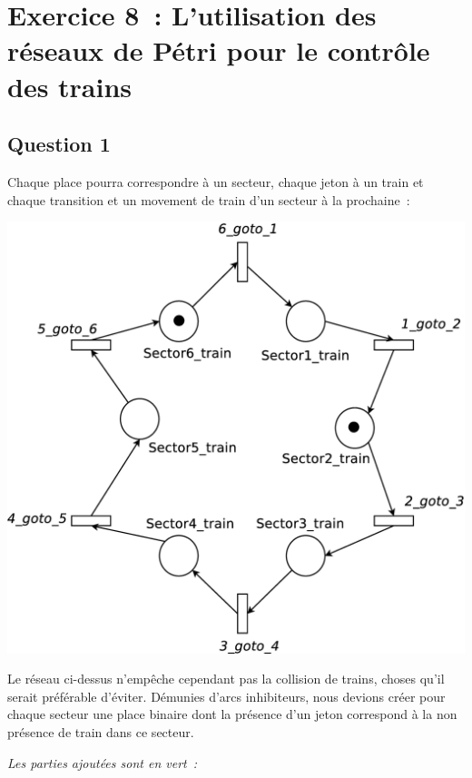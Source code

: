 \section*{Exercice 8~: L'utilisation des réseaux de Pétri pour le
  contrôle des trains}

\subsection*{Question 1}

Chaque place pourra correspondre à un secteur, chaque jeton à un train et chaque
transition et un movement de train d'un secteur à la prochaine~:

\begin{center}
\includegraphics[height = 0.3\paperwidth]{exo8_1.eps}
\end{center}

Le réseau ci-dessus n'empêche cependant pas la collision de trains, choses qu'il 
serait préférable d'éviter. Démunies d'arcs inhibiteurs, nous devions créer pour 
chaque secteur une place binaire dont la présence d'un jeton correspond à la non 
présence de train dans ce secteur.

\emph{Les parties ajoutées sont en vert~:}

